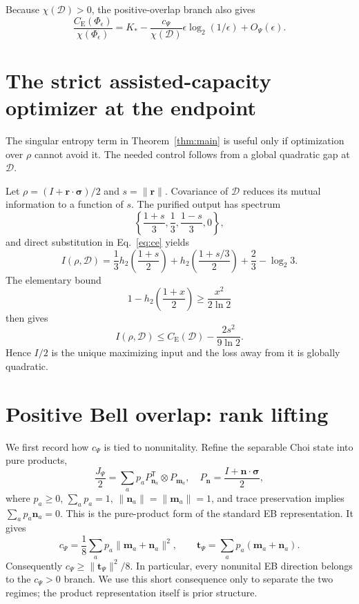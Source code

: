 \documentclass[aip,jmp,reprint,amsmath,amssymb]{revtex4-2}
\newcommand{\D}{\mathcal{D}}
\newcommand{\eps}{\epsilon}
\newcommand{\CE}{C_{\mathrm E}}
\begin{document}
Because $\chi(\D)>0$, the positive-overlap branch also gives
\begin{equation}
 \frac{\CE(\Phi_\eps)}{\chi(\Phi_\eps)}
 =K_*-\frac{c_\Psi}{\chi(\D)}\eps\log_2(1/\eps)+O_\Psi(\eps).
 \label{eq:ratio}
\end{equation}

\section{The strict assisted-capacity optimizer at the endpoint}
\label{sec:endpoint}

The singular entropy term in Theorem~\ref{thm:main} is useful only if optimization over $\rho$ cannot avoid it.  The needed control follows from a global quadratic gap at $\D$.

Let $\rho=(I+\bm r\cdot\bm\sigma)/2$ and $s=\|\bm r\|$.  Covariance of $\D$ reduces its mutual information to a function of $s$.  The purified output has spectrum
\begin{equation}
 \left\{\frac{1+s}{3},\frac13,\frac{1-s}{3},0\right\},
 \label{eq:endpointspectrum}
\end{equation}
and direct substitution in Eq.~\eqref{eq:ce} yields
\begin{equation}
 I(\rho,\D)=\frac13h_2\!\left(\frac{1+s}{2}\right)
 +h_2\!\left(\frac{1+s/3}{2}\right)
 +\frac23-\log_2 3.
 \label{eq:endpointMI}
\end{equation}
The elementary bound
\begin{equation}
 1-h_2\!\left(\frac{1+x}{2}\right)\geq\frac{x^2}{2\ln2}
 \label{eq:binarybound}
\end{equation}
then gives
\begin{equation}
 I(\rho,\D)\leq\CE(\D)-\frac{2s^2}{9\ln2}.
 \label{eq:quadraticgap}
\end{equation}
Hence $I/2$ is the unique maximizing input and the loss away from it is globally quadratic.

\section{Positive Bell overlap: rank lifting}
\label{sec:positive}

We first record how $c_\Psi$ is tied to nonunitality.  Refine the separable Choi state into pure products,
\begin{equation}
 \frac{J_\Psi}{2}=\sum_a p_a P_{\bm n_a}^{\mathsf T}\otimes P_{\bm m_a},
 \quad P_{\bm n}=\frac{I+\bm n\cdot\bm\sigma}{2},
 \label{eq:productdecomp}
\end{equation}
where $p_a\geq0$, $\sum_ap_a=1$, $\|\bm n_a\|=\|\bm m_a\|=1$, and trace preservation implies $\sum_ap_a\bm n_a=0$.  This is the pure-product form of the standard EB representation.\cite{Horodecki2003,Ruskai2003}  It gives
\begin{equation}
 c_\Psi=\frac18\sum_ap_a\|\bm m_a+\bm n_a\|^2,\qquad
 \bm t_\Psi=\sum_ap_a(\bm m_a+\bm n_a).
 \label{eq:geometry}
\end{equation}
Consequently $c_\Psi\geq\|\bm t_\Psi\|^2/8$.  In particular, every nonunital EB direction belongs to the $c_\Psi>0$ branch.  We use this short consequence only to separate the two regimes; the product representation itself is prior structure.
\end{document}
